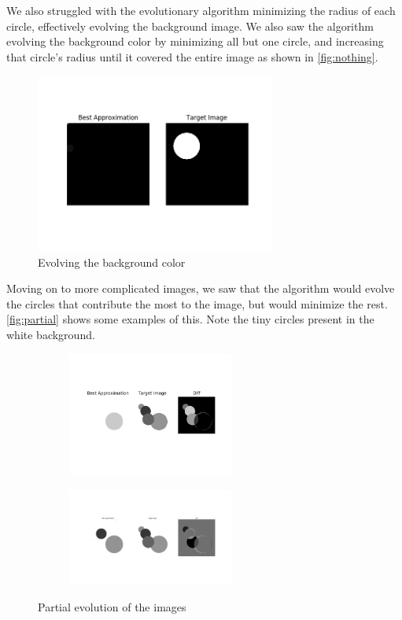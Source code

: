 \documentclass{article}
\begin{document}
We also struggled with the evolutionary algorithm minimizing the radius of each circle, effectively
evolving the background image. We also saw the algorithm evolving the background color by
minimizing all but one circle, and increasing that circle's radius until it covered the entire
image as shown in \autoref{fig:nothing}.

\begin{figure}[H]
    \centering
    \includegraphics[width=0.7\textwidth]{output/evolve_nothing.png}
    \caption{Evolving the background color}\label{fig:nothing}
\end{figure}

Moving on to more complicated images, we saw that the algorithm would evolve the circles that
contribute the most to the image, but would minimize the rest. \autoref{fig:partial} shows some
examples of this. Note the tiny circles present in the white background.

\begin{figure}[H]
    \centering
    \begin{subfigure}[b]{\textwidth}
        \centering
        \includegraphics[width=0.6\textwidth]{output/evolve_one.png}
    \end{subfigure}
    \begin{subfigure}[b]{\textwidth}
        \centering
        \includegraphics[width=0.6\textwidth]{output/evolve_some.png}
    \end{subfigure}
    \caption{Partial evolution of the images}\label{fig:partial}
\end{figure}
\end{document}
